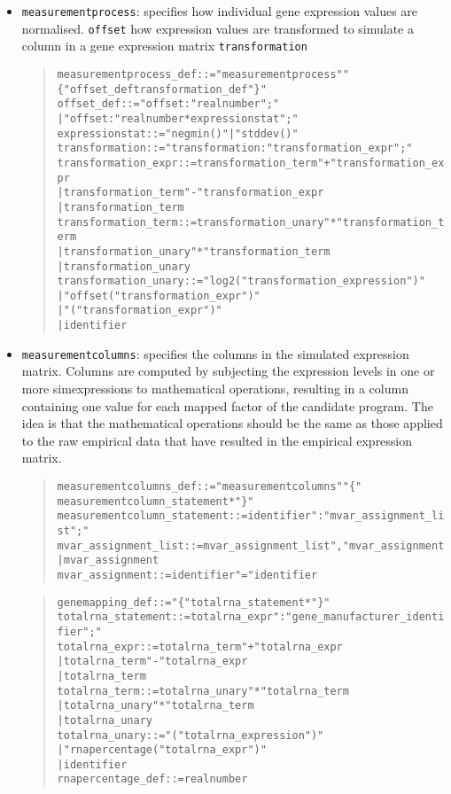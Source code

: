 \documentclass[a4paper,fleqn]{article}
\newcommand{\computercode}[1]{\texttt{#1}}
\newenvironment{ebnfrule}{\begin{footnotesize}\begin{quote}\begin{alltt}}{\end{alltt}\end{quote}\end{footnotesize}}
\begin{document}
\begin{itemize}
\item\computercode {measurementprocess}: specifies how individual gene
  expression values are normalised. \computercode{offset} how
  expression values are transformed to simulate a column in a gene
  expression matrix \computercode{transformation}

\begin{ebnfrule}

measurementprocess_def ::= "measurementprocess" "\{" offset_def transformation_def "\}"
offset_def ::= "offset:" realnumber ";"
        | "offset:" realnumber * expressionstat ";"
expressionstat ::= "negmin()" | "stddev()"
transformation ::= "transformation:" transformation_expr ";"
transformation_expr ::= transformation_term "+" transformation_expr
        | transformation_term "-" transformation_expr
        | transformation_term
transformation_term ::= transformation_unary "*" transformation_term
        | transformation_unary "*" transformation_term
        | transformation_unary
transformation_unary ::= "log2(" transformation_expression ")"
        | "offset(" transformation_expr ")"
        | "(" transformation_expr ")"
        | identifier

\end{ebnfrule}

\item \computercode{measurementcolumns}: specifies the columns in the
  simulated expression matrix. Columns are computed by subjecting the
  expression levels in one or more simexpressions to mathematical
  operations, resulting in a column containing one value for each
  mapped factor of the candidate program. The idea is that the
  mathematical operations should be the same as those applied to the
  raw empirical data that have resulted in the empirical expression
  matrix.

\begin{ebnfrule}
measurementcolumns_def ::=  "measurementcolumns" "\{" 
measurementcolumn_statement* "\}"
measurementcolumn_statement ::= identifier ":" mvar_assignment_list ";"
mvar_assignment_list ::= mvar_assignment_list "," mvar_assignment
        | mvar_assignment
mvar_assignment ::= identifier "=" identifier
\end{ebnfrule}

\begin{ebnfrule}
genemapping_def ::= "\{" totalrna_statement* "\}" 
totalrna_statement ::= totalrna_expr ":" gene_manufacturer_identifier ";"
totalrna_expr ::= totalrna_term "+" totalrna_expr
        | totalrna_term "-" totalrna_expr
        | totalrna_term
totalrna_term ::= totalrna_unary "*" totalrna_term
        | totalrna_unary "*" totalrna_term
        | totalrna_unary
totalrna_unary ::= "(" totalrna_expression ")"
        | "rnapercentage(" totalrna_expr ")"
        | identifier
rnapercentage_def ::= realnumber


\end{ebnfrule}
\end{itemize}
\end{document}
